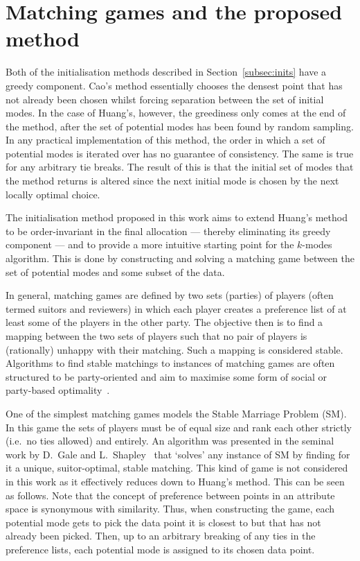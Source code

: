 \section{Matching games and the proposed method}\label{sec:method}

Both of the initialisation methods described in Section~\ref{subsec:inits} have
a greedy component. Cao's method essentially chooses the densest point that has
not already been chosen whilst forcing separation between the set of initial
modes. In the case of Huang's, however, the greediness only comes at the end
of the method, after the set of potential modes has been found by random
sampling.  In any practical implementation of this method, the order in which a
set of potential modes is iterated over has no guarantee of consistency. The
same is true for any arbitrary tie breaks. The result of this is that the
initial set of modes that the method returns is altered since the next initial
mode is chosen by the next locally optimal choice.

The initialisation method proposed in this work aims to extend Huang's method to
be order-invariant in the final allocation --- thereby eliminating its greedy
component --- and to provide a more intuitive starting point for the \(k\)-modes
algorithm. This is done by constructing and solving a matching game between the
set of potential modes and some subset of the data.

In general, matching games are defined by two sets (parties) of players (often
termed suitors and reviewers) in which each player creates a preference list of
at least some of the players in the other party. The objective then is to find a
mapping between the two sets of players such that no pair of players is
(rationally) unhappy with their matching. Such a mapping is considered stable.
Algorithms to find stable matchings to instances of matching games are often
structured to be party-oriented and aim to maximise some form of social or
party-based optimality~\cite{Fuku2006,Gale1962,Kwanashie2015}.

One of the simplest matching games models the Stable Marriage Problem (SM). In
this game the sets of players must be of equal size and rank each other strictly
(i.e.\ no ties allowed) and entirely. An algorithm was presented in the seminal
work by D.\ Gale and L.\ Shapley~\cite{Gale1962} that `solves' any instance of
SM by finding for it a unique, suitor-optimal, stable matching. This kind of
game is not considered in this work as it effectively reduces down to Huang's
method. This can be seen as follows. Note that the concept of preference between
points in an attribute space is synonymous with similarity. Thus, when
constructing the game, each potential mode gets to pick the data point it is
closest to but that has not already been picked. Then, up to an arbitrary
breaking of any ties in the preference lists, each potential mode is assigned to
its chosen data point.

